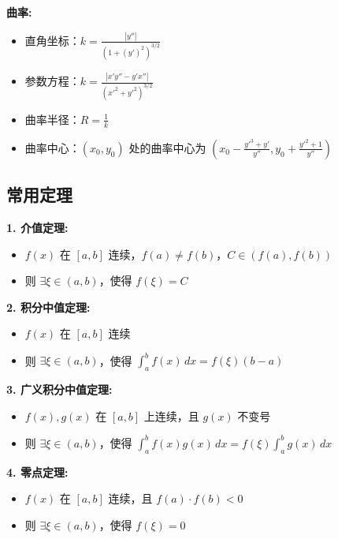 \documentclass[10pt]{article}
\begin{document}
\begin{multicols*}{2}
\textbf{曲率:}
\begin{itemize}
  \item 直角坐标：\(k = \frac{|y''|}{(1 + (y')^2)^{3/2}}\)
  \item 参数方程：\(k = \frac{|x'y'' - y'x''|}{(x'^2 + y'^2)^{3/2}}\)
  \item 曲率半径：\(R = \frac{1}{k}\)
  \item 曲率中心：\((x_0, y_0)\) 处的曲率中心为 \((x_0 - \frac{y'^3 + y'}{y''} , y_0 + \frac{y'^2 + 1}{y''})\)
\end{itemize}

\end{multicols*}

\newpage
\begin{multicols*}{2}
\raggedcolumns

\section*{常用定理}

\textbf{1. 介值定理:}
\begin{itemize}
  \item \(f(x)\) 在 \([a, b]\) 连续，\(f(a) \neq f(b)\)，\(C \in (f(a), f(b))\)
  \item 则 \(\exists \xi \in (a, b)\)，使得 \(f(\xi) = C\)
\end{itemize}

\textbf{2. 积分中值定理:}
\begin{itemize}
  \item \(f(x)\) 在 \([a, b]\) 连续
  \item 则 \(\exists \xi \in (a, b)\)，使得 \(\int_a^b f(x) \, dx = f(\xi)(b - a)\)
\end{itemize}

\textbf{3. 广义积分中值定理:}
\begin{itemize}
  \item \(f(x), g(x)\) 在 \([a, b]\) 上连续，且 \(g(x)\) 不变号
  \item 则 \(\exists \xi \in (a, b)\)，使得 \(\int_a^b f(x)g(x) \, dx = f(\xi) \int_a^b g(x) \, dx\)
\end{itemize}

\textbf{4. 零点定理:}
\begin{itemize}
  \item \(f(x)\) 在 \([a, b]\) 连续，且 \(f(a) \cdot f(b) < 0\)
  \item 则 \(\exists \xi \in (a, b)\)，使得 \(f(\xi) = 0\)
\end{itemize}


\end{multicols*}
\end{document}
